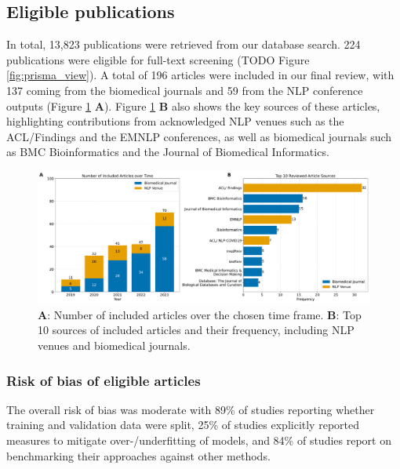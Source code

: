 \documentclass[fleqn,10pt]{olplainarticle}
\begin{document}
\subsection*{Eligible publications}

In total, 13,823 publications were retrieved from our database search. 224 publications were eligible for full-text screening (TODO Figure \ref{fig:prisma_view}).
A total of 196 articles were included in our final review, with 137 coming from the biomedical journals and 59 from the NLP conference outputs (Figure \ref{fig:top_10_journals_venues_and_time_distribution} \textbf{A}). Figure \ref{fig:top_10_journals_venues_and_time_distribution} \textbf{B} also shows the key sources of these articles, highlighting contributions from acknowledged NLP venues such as the ACL/Findings and the EMNLP conferences, as well as biomedical journals such as BMC Bioinformatics and the Journal of Biomedical Informatics.



\begin{figure}[!ht]
\begin{center}
\includegraphics[scale=0.3]{visuals/new_pdf/overview_years_and_journal_count_2024.pdf} %
\caption{\textbf{A}: Number of included articles over the chosen time frame. \textbf{B}: Top 10 sources of included articles and their frequency, including  NLP venues and biomedical journals.}
\label{fig:top_10_journals_venues_and_time_distribution}
\end{center}
\end{figure}

\subsubsection*{Risk of bias of eligible articles}
The overall risk of bias was moderate with 89\% of studies reporting whether training and validation data were split, 25\% of studies explicitly reported measures to mitigate over-/underfitting of models, and 84\% of studies report on benchmarking their approaches against other methods. %
\end{document}
